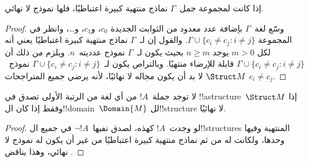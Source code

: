 \documentclass[../../../include/open-logic-section]{subfiles}
\begin{document}

\begin{thm}
 إذا كانت لمجموعة جمل~$\Gamma$ نماذج منتهية كبيرة
اعتباطيًا، فلها نموذج لا نهائي.
\end{thm}

\begin{proof}
وسّع لغة~$\Gamma$ بإضافة عدد معدود من الثوابت الجديدة $c_0$، و$c_1$،
و\dots، وانظر في المجموعة $\Gamma \cup \{c_i \neq c_j : i \neq
j\}$. والقول إن لـ~$\Gamma$ نماذج منتهية كبيرة اعتباطيًا يعني أنه
لكل $m >0$ يوجد $n\ge m$ بحيث يكون لـ~$\Gamma$ نموذج عدديته~$n$.
ويلزم من ذلك أن $\Gamma \cup \{c_i \neq c_j : i \neq j\}$ قابلة
للإرضاء منتهيًا. وبالتراص يكون لـ~$\Gamma \cup \{c_i \neq c_j : i
\neq j\}$ نموذج~$\Struct M$ لا بد أن يكون مجاله لا نهائيًا، لأنه
يرضي جميع المتراجحات $c_i \neq c_j$.
\end{proof}

\begin{prop}
لا توجد جملة~$!A$ من أي لغة من الرتبة الأولى تصدق في
!!a{structure}~$\Struct M$ إذا وفقط إذا كان ال!!{domain}~$\Domain{M}$
لل!!{structure} لا نهائيًا.
\end{prop}

\begin{proof}
لو وجدت~$!A$ كهذه، لصدق نفيها~$\lnot !A$ في جميع ال!!{structure}s
المنتهية وفيها وحدها، ولكانت له من ثم نماذج منتهية كبيرة اعتباطيًا من
غير أن يكون له نموذج لا نهائي، وهذا يناقض .
\end{proof}
\end{document}
